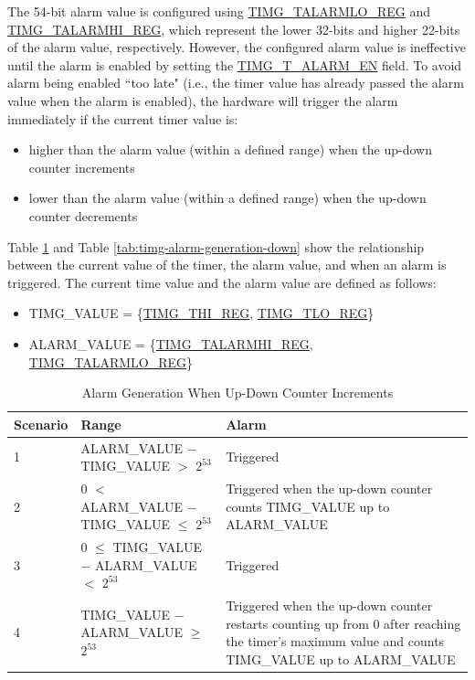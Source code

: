 \documentclass[main\_\_EN.tex]{subfiles}
\begin{document}
The 54-bit alarm value is configured using \hyperref[regdesc:TIMGTXALARMLOREG]{TIMG\_TALARMLO\_REG} and \hyperref[regdesc:TIMGTXALARMHIREG]{TIMG\_TALARMHI\_REG}, which represent the lower 32-bits and higher 22-bits of the alarm value, respectively. However, the configured alarm value is ineffective until the alarm is enabled by setting the \hyperref[fielddesc:TIMGTXALARMEN]{TIMG\_T\_ALARM\_EN} field. To avoid alarm being enabled ``too late" (i.e., the timer value has already passed the alarm value when the alarm is enabled), the hardware will trigger the alarm immediately if the current timer value is:
\begin{itemize}
    \item higher than the alarm value (within a defined range) when the up-down counter increments
    \item lower than the alarm value (within a defined range) when the up-down counter decrements
\end{itemize}

Table \ref{tab:timg-alarm-generation-up} and Table \ref{tab:timg-alarm-generation-down} show the relationship between the current value of the timer, the alarm value, and when an alarm is triggered. The current time value and the alarm value are defined as follows:

\begin{itemize}
    \item TIMG\_VALUE = \{\hyperref[regdesc:TIMGTXHIREG]{TIMG\_THI\_REG}, \hyperref[regdesc:TIMGTXLOREG]{TIMG\_TLO\_REG}\}
    \item ALARM\_VALUE = \{\hyperref[regdesc:TIMGTXALARMHIREG]{TIMG\_TALARMHI\_REG}, \hyperref[regdesc:TIMGTXALARMLOREG]{TIMG\_TALARMLO\_REG}\}
\end{itemize}


\begin{table}[H]
\centering
\caption{Alarm Generation When Up-Down Counter Increments}
\label{tab:timg-alarm-generation-up}

\begin{tabular}{|l|l|m{7cm}|}
\hline
\rowcolor{lightgray}
    \textbf{Scenario} & \textbf{Range} & \textbf{Alarm} \\\hline
     1 & ALARM\_VALUE $-$ TIMG\_VALUE $>$ $2^{53}$ & Triggered \\\hline
     2 & 0 $<$ ALARM\_VALUE $-$ TIMG\_VALUE $\leq$ $2^{53}$ & Triggered when the up-down counter counts TIMG\_VALUE up to ALARM\_VALUE \\\hline
     3 & 0 $\leq$ TIMG\_VALUE $-$ ALARM\_VALUE $<$ $2^{53}$ & Triggered \\\hline
     4 & TIMG\_VALUE $-$ ALARM\_VALUE $\geq$ $2^{53}$ & Triggered when the up-down counter restarts counting up from 0 after reaching the timer's maximum value and counts TIMG\_VALUE up to ALARM\_VALUE \\\hline

\end{tabular}
\end{table}
\end{document}
